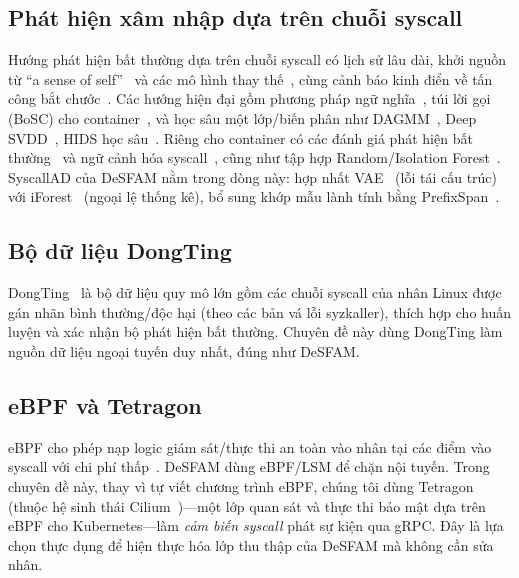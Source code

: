 \subsection{Phát hiện xâm nhập dựa trên chuỗi syscall}
Hướng phát hiện bất thường dựa trên chuỗi syscall có lịch sử lâu dài, khởi nguồn
từ ``a sense of self''~\cite{forrest1996sense,hofmeyr1998ids} và các mô hình thay
thế~\cite{warrender1999detecting}, cùng cảnh báo kinh điển về tấn công bắt
chước~\cite{wagner2002mimicry}. Các hướng hiện đại gồm phương pháp ngữ
nghĩa~\cite{creech2014semantic}, túi lời gọi (BoSC) cho
container~\cite{abed2015bag}, và học sâu một lớp/biến phân như
DAGMM~\cite{zong2018dagmm}, Deep SVDD~\cite{ruff2018deepsvdd},
HIDS học sâu~\cite{haider2021deep}. Riêng cho container có các đánh giá phát hiện
bất thường~\cite{castanhel2021peek} và ngữ cảnh hóa syscall~\cite{elkhairi2022chids},
cũng như tập hợp Random/Isolation Forest~\cite{bsoul2022ensemble}. SyscallAD của
DeSFAM nằm trong dòng này: hợp nhất VAE~\cite{vae_kingma} (lỗi tái cấu trúc) với
iForest~\cite{iforest_liu} (ngoại lệ thống kê), bổ sung khớp mẫu lành tính bằng
PrefixSpan~\cite{prefixspan_pei}.

\subsection{Bộ dữ liệu DongTing}
DongTing~\cite{ref26_dongtingdataset} là bộ dữ liệu quy mô lớn gồm các chuỗi
syscall của nhân Linux được gán nhãn bình thường/độc hại (theo các bản vá lỗi
syzkaller), thích hợp cho huấn luyện và xác nhận bộ phát hiện bất thường. Chuyên
đề này dùng DongTing làm nguồn dữ liệu ngoại tuyến duy nhất, đúng như DeSFAM.

\subsection{eBPF và Tetragon}
eBPF cho phép nạp logic giám sát/thực thi an toàn vào nhân tại các điểm vào syscall
với chi phí thấp~\cite{ref20_bpf_security}. DeSFAM dùng eBPF/LSM để chặn nội tuyến.
Trong chuyên đề này, thay vì tự viết chương trình eBPF, chúng tôi dùng
Tetragon~\cite{tetragon} (thuộc hệ sinh thái Cilium~\cite{cilium})---một lớp quan
sát và thực thi bảo mật dựa trên eBPF cho Kubernetes---làm \emph{cảm biến syscall}
phát sự kiện qua gRPC. Đây là lựa chọn thực dụng để hiện thực hóa lớp thu thập của
DeSFAM mà không cần sửa nhân.

